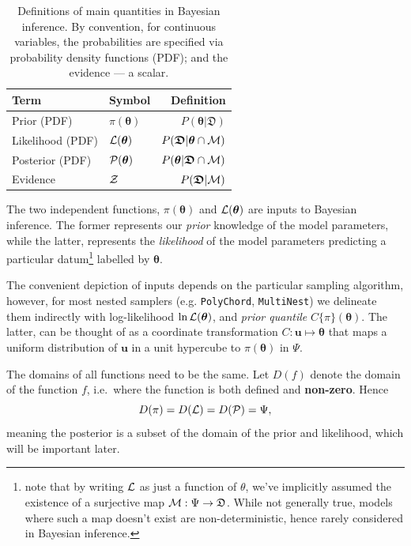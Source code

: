 \documentclass[usenatbib]{mnras}
\begin{document}
\begin{table}
  \caption{Definitions of main quantities in Bayesian inference. By
    convention, for continuous variables, the probabilities are
    specified via probability density functions (PDF); and the
    evidence --- a scalar.  \label{table-defs}}
\centering
\begin{tabular}{llr}
\textbf{\textbf{Term}} & \textbf{\textbf{Symbol}} & \textbf{\textbf{Definition}}\\
\hline
Prior (PDF) & \(\pi(\bm{\theta})\) & \(P ( \bm{\theta}  \vert \bm{ \mathfrak{D}})\) \\
Likelihood (PDF) & \({\cal L}(\bm{\theta})\) & \(P ( \bm{\mathfrak{D}} \vert \bm{\theta} \cap {\cal M})\) \\
Posterior (PDF) & \({\cal P}(\bm{\theta})\) & \(P ( \bm{\theta} \vert \bm{\mathfrak{D}} \cap {\cal M})\) \\
Evidence & \({\cal Z}\) & \(P ( \bm{\mathfrak{D}} \vert {\cal M})\) \\
\end{tabular}
\end{table}

The two independent functions, \(\pi(\bm{\theta})\) and
\({\cal L}(\bm{\theta})\) are inputs to Bayesian inference. The former
represents our \emph{prior} knowledge of the model parameters, while
the latter, represents the \emph{likelihood} of the model parameters
predicting a particular datum\footnote{note that by writing ${\cal L}$
  as just a function of $\theta$, we've implicitly assumed the
  existence of a surjective map
  ${\cal M}: \Psi \rightarrow \mathfrak{D}$. While not generally true,
  models where such a map doesn't exist are non-deterministic, hence
  rarely considered in Bayesian inference. } labelled by
$\bm{\theta}$.

The convenient depiction of inputs depends on the particular sampling
algorithm, however, for most nested samplers (e.g. \texttt{PolyChord},
\texttt{MultiNest}) we delineate them indirectly with log-likelihood
\(\ln \cal L (\bm{\theta})\), and \emph{prior quantile}
\(C\{\pi\}(\bm{\theta})\). The latter, can be thought of as a
coordinate transformation $C: \bm{u} \mapsto \bm{\theta}$ that maps a
uniform distribution of $\bm{u}$ in a unit hypercube to
$\pi(\bm{\theta})$ in $\Psi$.

The domains of all functions need to be the same. Let
\(D(f)\) denote the domain of the function \(f\), i.e.~where the
function is both defined and \textbf{non-zero}. Hence
\begin{equation}
  D(\pi) = D({\cal L})  = D({\cal P})= \Psi,
\end{equation} 
meaning the posterior is a subset of the domain of the prior and
likelihood, which will be important later.\label{domain-discussion}
\end{document}
